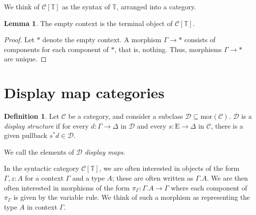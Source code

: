 \documentclass{article}
\theoremstyle{definition}
\newtheorem{definition}{Definition}[section]
\theoremstyle{theorem}
\newtheorem{lemma}{Lemma}[section]
\newcommand{\T}{\mathbb T}
\newcommand{\C}{\mathcal C}
\newcommand{\D}{\mathcal D}
\newcommand{\syncat}[1]{\C [#1]}
\newcommand{\Epsilon}{\mathrm E}
\newcommand{\mor}{\mathrm {mor}}
\begin{document}
We think of $\syncat{\T}$ as the syntax of $\T$, arranged into a category.

\begin{lemma}
    The empty context is the terminal object of $\syncat{\T}$.
\end{lemma}
\begin{proof}
    Let $*$ denote the empty context. A morphism $\Gamma \to *$ consists of components for each component of $*$, that is, nothing. Thus, morphisms $\Gamma \to *$ are unique.
\end{proof}

\section{Display map categories}

\begin{definition}
    Let $\C$ be a category, and consider a subclass $\D \subseteq \mor (\C)$. $\D$ is a \emph{display structure} \cite{taylor} if for every $d : \Gamma \to \Delta$ in $\D$ and every $s: \Epsilon \to \Delta$ in $\C$, there is a given pullback $s^* d \in \D$.

    We call the elements of $\D$ \emph{display maps}.
\end{definition}

In the syntactic category $\syncat{\T}$, we are often interested in objects of the form $\Gamma, z: A$ for a context $\Gamma$ and a type $A$; these are often written as $\Gamma.A$. We are then often interested in morphisms of the form $\pi_\Gamma : \Gamma.A \to \Gamma$ where each component of $\pi_\Gamma$ is given by the variable rule. We think of such a morphism as representing the type $A$ in context $\Gamma$.
\end{document}
